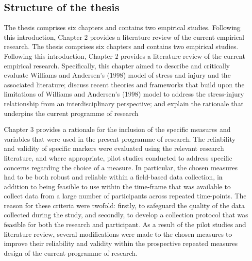\documentclass[
  english,
  man,floatsintext]{apa6}
\begin{document}
\hypertarget{structure-of-the-thesis}{%
\subsection{Structure of the thesis}\label{structure-of-the-thesis}}

The thesis comprises six chapters and contains two empirical studies.
Following this introduction, Chapter 2 provides a literature review of the current empirical research.
The thesis comprises six chapters and contains two empirical studies. Following this introduction, Chapter 2 provides a literature review of the current empirical research. Specifically, this chapter aimed to describe and critically evaluate Williams and Andersen's (1998) model of stress and injury and the associated literature; discuss recent theories and frameworks that build upon the limitations of Williams and Andersen's (1998) model to address the stress-injury relationship from an interdisciplinary perspective; and explain the rationale that underpins the current programme of research

Chapter 3 provides a rationale for the inclusion of the specific measures and variables that were used in the present programme of research.
The reliability and validity of specific markers were evaluated using the relevant research literature, and where appropriate, pilot studies conducted to address specific concerns regarding the choice of a measure.
In particular, the chosen measures had to be both robust and reliable within a field-based data collection, in addition to being feasible to use within the time-frame that was available to collect data from a large number of participants across repeated time-points. The reason for these criteria were twofold: firstly, to safeguard the quality of the data collected during the study, and secondly, to develop a collection protocol that was feasible for both the research and participant.
As a result of the pilot studies and literature review, several modifications were made to the chosen measures to improve their reliability and validity within the prospective repeated measures design of the current programme of research.
\end{document}
